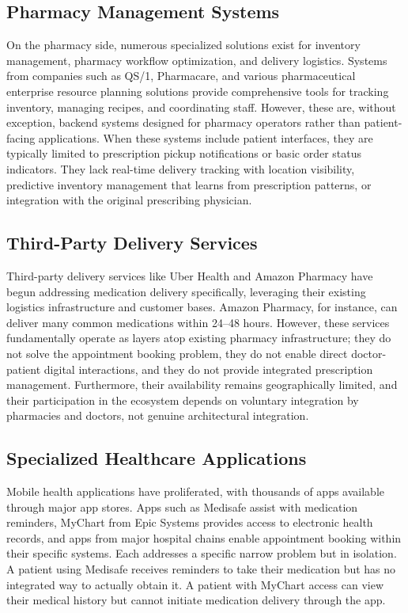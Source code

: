 \documentclass[12pt,a4paper]{report}
\begin{document}
\subsection{Pharmacy Management Systems}

On the pharmacy side, numerous specialized solutions exist for inventory management, pharmacy workflow optimization, and delivery logistics. Systems from companies such as QS/1, Pharmacare, and various pharmaceutical enterprise resource planning solutions provide comprehensive tools for tracking inventory, managing recipes, and coordinating staff. However, these are, without exception, backend systems designed for pharmacy operators rather than patient-facing applications. When these systems include patient interfaces, they are typically limited to prescription pickup notifications or basic order status indicators. They lack real-time delivery tracking with location visibility, predictive inventory management that learns from prescription patterns, or integration with the original prescribing physician.

\subsection{Third-Party Delivery Services}

Third-party delivery services like Uber Health and Amazon Pharmacy have begun addressing medication delivery specifically, leveraging their existing logistics infrastructure and customer bases. Amazon Pharmacy, for instance, can deliver many common medications within 24--48 hours. However, these services fundamentally operate as layers atop existing pharmacy infrastructure; they do not solve the appointment booking problem, they do not enable direct doctor-patient digital interactions, and they do not provide integrated prescription management. Furthermore, their availability remains geographically limited, and their participation in the ecosystem depends on voluntary integration by pharmacies and doctors, not genuine architectural integration.

\subsection{Specialized Healthcare Applications}

Mobile health applications have proliferated, with thousands of apps available through major app stores. Apps such as Medisafe assist with medication reminders, MyChart from Epic Systems provides access to electronic health records, and apps from major hospital chains enable appointment booking within their specific systems. Each addresses a specific narrow problem but in isolation. A patient using Medisafe receives reminders to take their medication but has no integrated way to actually obtain it. A patient with MyChart access can view their medical history but cannot initiate medication delivery through the app.
\end{document}
